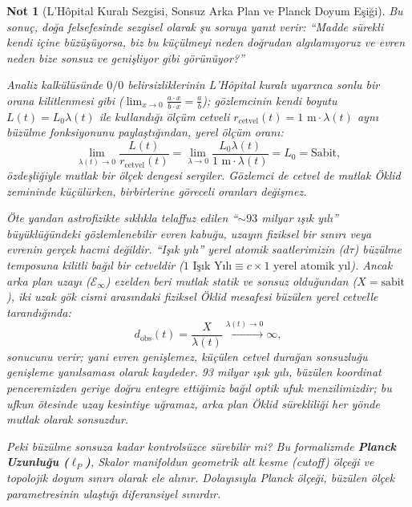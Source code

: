 \documentclass[11pt,a4paper]{article}
\newtheorem{remark}{Not}[section]
\begin{document}
\begin{remark}[L'H\^opital Kuralı Sezgisi, Sonsuz Arka Plan ve Planck Doyum Eşiği]
    \label{rem:lhopital_ve_planck_sc}
    Bu sonuç, doğa felsefesinde sezgisel olarak şu soruya yanıt verir: \textit{``Madde sürekli kendi içine büzüşüyorsa, biz bu küçülmeyi neden doğrudan algılamıyoruz ve evren neden bize sonsuz ve genişliyor gibi görünüyor?''}

    Analiz kalkülüsünde $0/0$ belirsizliklerinin L'H\^opital kuralı uyarınca sonlu bir orana kilitlenmesi gibi ($\lim_{x \to 0} \frac{a \cdot x}{b \cdot x} = \frac{a}{b}$); gözlemcinin kendi boyutu $L(t) = L_0 \lambda(t)$ ile kullandığı ölçüm cetveli $r_{\mathrm{cetvel}}(t) = 1\text{ m} \cdot \lambda(t)$ aynı büzülme fonksiyonunu paylaştığından, yerel ölçüm oranı:
    \begin{equation}
        \lim_{\lambda(t) \to 0} \frac{L(t)}{r_{\mathrm{cetvel}}(t)} = \lim_{\lambda \to 0} \frac{L_0 \lambda(t)}{1\text{ m} \cdot \lambda(t)} = L_0 = \text{Sabit},
        \label{eq:lhopital_oran_sc}
    \end{equation}
    özdeşliğiyle mutlak bir ölçek dengesi sergiler. Gözlemci de cetvel de mutlak Öklid zemininde küçülürken, birbirlerine göreceli oranları değişmez.

    Öte yandan astrofizikte sıklıkla telaffuz edilen ``$\sim 93$ milyar ışık yılı'' büyüklüğündeki gözlemlenebilir evren kabuğu, uzayın fiziksel bir sınırı veya evrenin gerçek hacmi değildir. ``Işık yılı'' yerel atomik saatlerimizin ($d\tau$) büzülme temposuna kilitli bağıl bir cetveldir ($1\text{ Işık Yılı} \equiv c \times 1\text{ yerel atomik yıl}$). Ancak arka plan uzayı ($\mathcal{E}_\infty$) ezelden beri mutlak statik ve sonsuz olduğundan ($X = \text{sabit}$), iki uzak gök cismi arasındaki fiziksel Öklid mesafesi büzülen yerel cetvelle tarandığında:
    \begin{equation}
        d_{\mathrm{obs}}(t) = \frac{X}{\lambda(t)} \xrightarrow{\lambda(t) \to 0} \infty,
        \label{eq:sonsuz_arka_plan_iraksama_sc}
    \end{equation}
    sonucunu verir; yani evren genişlemez, küçülen cetvel durağan sonsuzluğu genişleme yanılsaması olarak kaydeder. 93 milyar ışık yılı, büzülen koordinat penceremizden geriye doğru entegre ettiğimiz bağıl optik ufuk menzilimizdir; bu ufkun ötesinde uzay kesintiye uğramaz, arka plan Öklid sürekliliği her yönde mutlak olarak sonsuzdur.

    Peki büzülme sonsuza kadar kontrolsüzce sürebilir mi? Bu formalizmde \textbf{Planck Uzunluğu ($\ell_P$)}, Skalor manifoldun geometrik alt kesme (cutoff) ölçeği ve topolojik doyum sınırı olarak ele alınır. Dolayısıyla Planck ölçeği, büzülen ölçek parametresinin ulaştığı diferansiyel sınırdır.
\end{remark}
\end{document}
